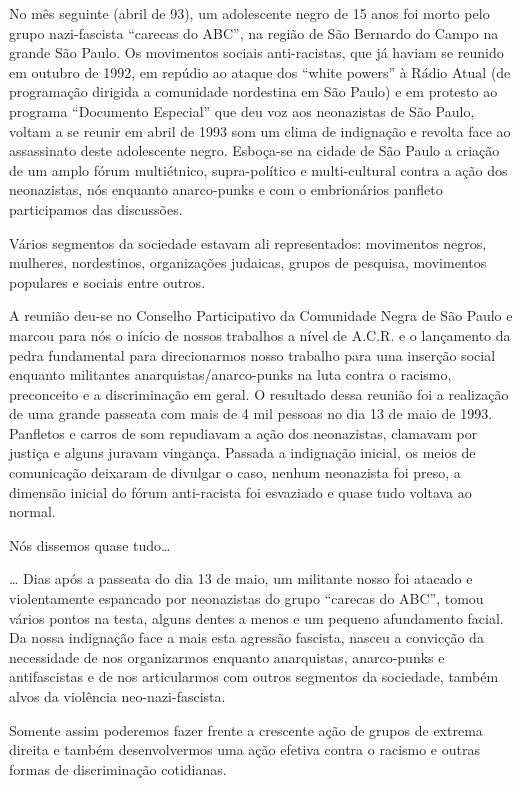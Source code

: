 No mês seguinte (abril de 93), um adolescente negro de 15 anos foi morto pelo grupo nazi-fascista “carecas do ABC”, na região de São Bernardo do Campo na grande São Paulo.
Os movimentos sociais anti-racistas, que já haviam se reunido em outubro de 1992, em repúdio ao ataque dos “white powers” à Rádio Atual (de programação dirigida a comunidade nordestina em São Paulo) e em protesto ao programa “Documento Especial” que deu voz aos neonazistas de São Paulo, voltam a se reunir em abril de 1993 som um clima de indignação e revolta face ao assassinato deste adolescente negro. Esboça-se na cidade de São Paulo a criação de um amplo fórum multiétnico, supra-político e multi-cultural contra a ação dos neonazistas, nós enquanto anarco-punks e com o embrionários panfleto participamos das discussões.

Vários segmentos da sociedade estavam ali representados: movimentos negros, mulheres, nordestinos, organizações judaicas, grupos de pesquisa, movimentos populares e sociais entre outros.

A reunião deu-se no Conselho Participativo da Comunidade Negra de São Paulo e marcou para nós o início de nossos trabalhos a nível de A.C.R. e o lançamento da pedra fundamental para direcionarmos nosso trabalho para uma inserção social enquanto militantes anarquistas/anarco-punks na luta contra o racismo, preconceito e a discriminação em geral.
O resultado dessa reunião foi a realização de uma grande passeata com mais de 4 mil pessoas no dia 13 de maio de 1993. Panfletos e carros de som repudiavam a ação dos neonazistas, clamavam por justiça e alguns juravam vingança.
Passada a indignação inicial, os meios de comunicação deixaram de divulgar o caso, nenhum neonazista foi preso, a dimensão inicial do fórum anti-racista foi esvaziado e quase tudo voltava ao normal.

Nós dissemos quase tudo…

… Dias após a passeata do dia 13 de maio, um militante nosso foi atacado e violentamente espancado por neonazistas do grupo “carecas do ABC”, tomou vários pontos na testa, alguns dentes a menos e um pequeno afundamento facial.
Da nossa indignação face a mais esta agressão fascista, nasceu a convicção da necessidade de nos organizarmos enquanto anarquistas, anarco-punks e antifascistas e de nos articularmos com outros segmentos da sociedade, também alvos da violência neo-nazi-fascista.

Somente assim poderemos fazer frente a crescente ação de grupos de extrema direita e também desenvolvermos uma ação efetiva contra o racismo e outras formas de discriminação cotidianas.

